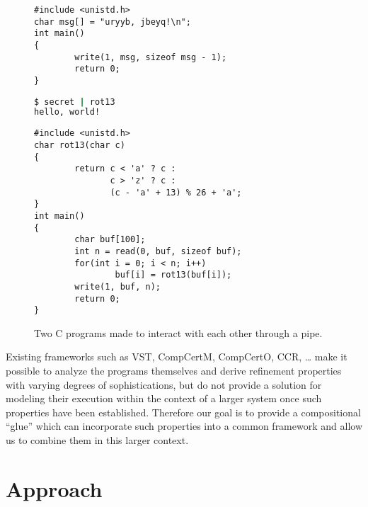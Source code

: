 \documentclass{report}
\begin{document}
\begin{figure}[h] %
\centering
\begin{minipage}{.40\textwidth}
\begin{lstlisting}[title={secret.c}]
#include <unistd.h>
char msg[] = "uryyb, jbeyq!\n";
int main()
{
        write(1, msg, sizeof msg - 1);
        return 0;
}
\end{lstlisting}
\begin{lstlisting}[title={typescript},language=sh]
$ secret | rot13
hello, world!
\end{lstlisting}
\end{minipage}
\hspace{3em}
\begin{minipage}{.45\textwidth}
\begin{lstlisting}[title={rot13.c}]
#include <unistd.h>
char rot13(char c)
{
        return c < 'a' ? c :
               c > 'z' ? c :
               (c - 'a' + 13) % 26 + 'a';
}
int main()
{
        char buf[100];
        int n = read(0, buf, sizeof buf);
        for(int i = 0; i < n; i++)
                buf[i] = rot13(buf[i]);
        write(1, buf, n);
        return 0;
}
\end{lstlisting}
\end{minipage}
\caption{Two C programs made to interact with each other
  through a pipe.}
\label{fig:readwritehello}
\end{figure}

Existing frameworks such as
VST, CompCertM, CompCertO, CCR, \ldots
make it possible to analyze the programs themselves
and derive refinement properties with varying degrees of sophistications,
but do not provide a solution for
modeling their execution within the context of a larger system
once such properties have been established.
Therefore our goal is to provide a compositional ``glue'' which can
incorporate such properties into a common framework and
allow us to combine them in this larger context.


\section{Approach} %
\end{document}
